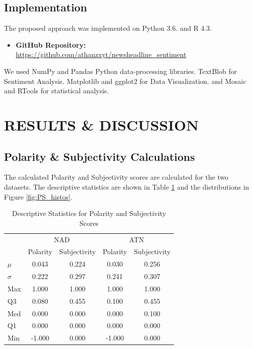 \documentclass[12pt]{article}
\begin{document}
\subsection{Implementation}

The proposed approach was implemented on Python 3.6. and R 4.3.

\begin{itemize}
    \item \textbf{GitHub Repository:} 
    \newline
    \url{https://github.com/athanzxyt/newsheadline_sentiment}
\end{itemize}

We used NumPy and Pandas Python data-processing libraries. TextBlob for Sentiment Analysis. Matplotlib and ggplot2 for Data Visualization. and Mosaic and RTools for statistical analysis.

\section{RESULTS \& DISCUSSION}

\subsection{Polarity \& Subjectivity Calculations}

The calculated Polarity and Subjectivity scores are calculated for the two datasets. The descriptive statistics are shown in Table \ref{lab:desc_stats} and the distributions in Figure \ref{fig:PS_histos}. 

\begin{table}[H]
    \centering
    \begin{tabular}{lcccc}
    \hline
                             & \multicolumn{2}{c}{NAD} & \multicolumn{2}{c}{ATN} \\
                             & Polarity & Subjectivity & Polarity & Subjectivity \\ \hline
    \multicolumn{1}{l|}{$\mu$}  & 0.043    & 0.224 & 0.030    & 0.256 \\
    \multicolumn{1}{l|}{$\sigma$}  & 0.222    & 0.297 & 0.241    & 0.307 \\
    \multicolumn{1}{l|}{Max} & 1.000    & 1.000 & 1.000    & 1.000 \\
    \multicolumn{1}{l|}{Q3}  & 0.080    & 0.455 & 0.100    & 0.455 \\
    \multicolumn{1}{l|}{Med} & 0.000   & 0.000 & 0.000    & 0.100 \\
    \multicolumn{1}{l|}{Q1}  & 0.000   & 0.000 & 0.000    & 0.000 \\
    \multicolumn{1}{l|}{Min} & -1.000       & 0.000 & -1.000       & 0.000 \\
    \hline
    \end{tabular}
    \caption{Descriptive Statistics for Polarity and Subjectivity Scores}
    \label{lab:desc_stats}
\end{table}
\end{document}
